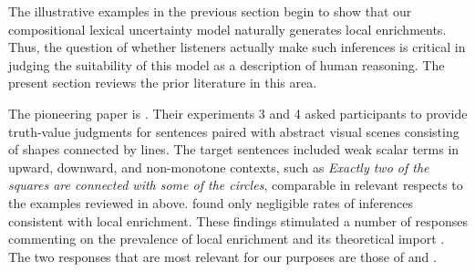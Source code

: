 \documentclass[leqno,12pt]{article}
\begin{document}
The illustrative examples in the previous section begin to show that
our compositional lexical uncertainty model naturally generates local
enrichments. Thus, the question of whether listeners actually make
such inferences is critical in judging the suitability of this model
as a description of human reasoning.  The present section reviews the
prior literature in this area.

The pioneering paper is \citealt{Geurts:Pouscoulous:2009}. Their
experiments 3 and 4 asked participants to provide truth-value
judgments for sentences paired with abstract visual scenes consisting
of shapes connected by lines. The target sentences included weak
scalar terms in upward, downward, and non-monotone contexts, such as
\emph{Exactly two of the squares are connected with some of the
  circles}, comparable in relevant respects to the examples reviewed
in  above.
\citeauthor{Geurts:Pouscoulous:2009} found only negligible rates of
inferences consistent with local enrichment. These findings stimulated
a number of responses commenting on the prevalence of local enrichment
and its theoretical import \citep{Ippolito:2010,Sauerland:2010}. The
two responses that are most relevant for our purposes are those of
\citet{Clifton:Dube:2010} and \citet{Chemla:Spector:2011}.
\end{document}
